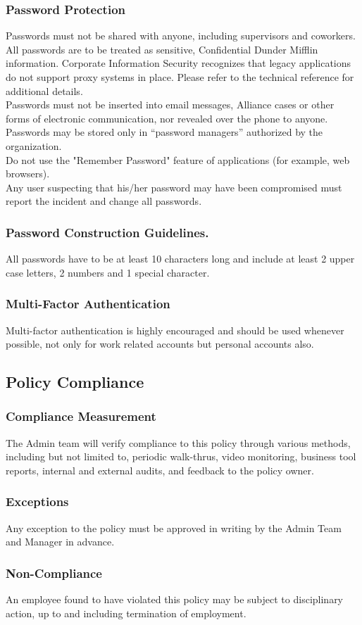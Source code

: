 \documentclass[11pt,onside]{article}
\begin{document}
\subsubsection{Password Protection}
Passwords must not be shared with anyone, including supervisors and coworkers. All
passwords are to be treated as sensitive, Confidential Dunder Mifflin information.
Corporate Information Security recognizes that legacy applications do not support proxy
systems in place. Please refer to the technical reference for additional details. \\
Passwords must not be inserted into email messages, Alliance cases or other forms of
electronic communication, nor revealed over the phone to anyone. \\
Passwords may be stored only in “password managers” authorized by the organization.\\
Do not use the "Remember Password" feature of applications (for example, web
browsers).\\
Any user suspecting that his/her password may have been compromised must report the
incident and change all passwords.\\
\subsubsection{Password Construction Guidelines.}
All passwords have to be at least 10 characters long and include at least 2 upper case letters, 2 numbers and 1 special character.
\subsubsection{Multi-Factor Authentication}
Multi-factor authentication is highly encouraged and should be used whenever possible,
not only for work related accounts but personal accounts also.
\subsection{Policy Compliance}
\subsubsection{Compliance Measurement}
The Admin team will verify compliance to this policy through various methods, including but
not limited to, periodic walk-thrus, video monitoring, business tool reports, internal and external
audits, and feedback to the policy owner. 
\subsubsection{Exceptions}
Any exception to the policy must be approved in writing by the Admin Team and Manager in advance. 
\subsubsection{Non-Compliance}
An employee found to have violated this policy may be subject to disciplinary action, up to and
including termination of employment. 
\end{document}
